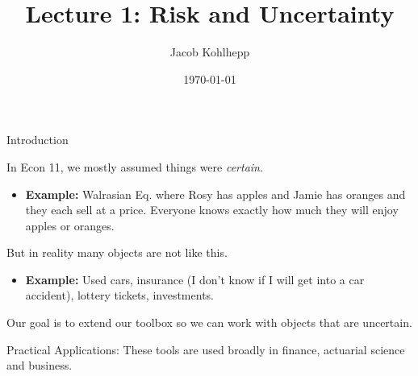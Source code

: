 \documentclass[aspectratio=169]{beamer}
\title[Risk]{Lecture 1: Risk and Uncertainty} %
\author{Jacob Kohlhepp} %
\institute[UCLA] %
{
Econ 101 \\ %
\medskip
}
\date{\today} %
\newenvironment{wideitemize}{\itemize\addtolength{\itemsep}{10pt}}{\enditemize}
\begin{document}
\begin{frame}
\titlepage %
\end{frame}

\begin{frame}{Introduction}
\begin{wideitemize}
    \item In Econ 11, we mostly assumed things were \textit{certain}.
    \begin{itemize}
        \item \textbf{Example:} Walrasian Eq. where Rosy has apples and Jamie has oranges and they each sell at a price. Everyone knows exactly how much they will enjoy apples or oranges.
    \end{itemize}
    \item But in reality many objects are not like this.
    \begin{itemize}
         \item \textbf{Example:} Used cars, insurance (I don't know if I will get into a car accident), lottery tickets, investments.
    \end{itemize}
    \item Our goal is to extend our toolbox so we can work with objects that are uncertain.
    \item Practical Applications: These tools are used broadly in finance, actuarial science and business.

\end{wideitemize}
    
\end{frame}
\end{document}
